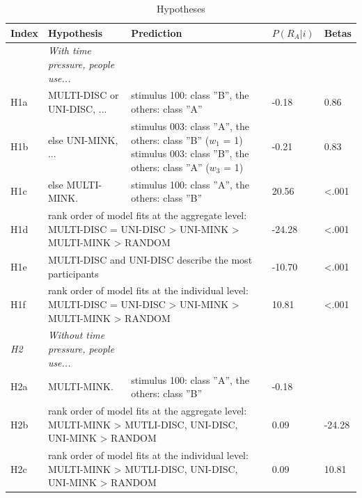 \documentclass[a4paper,man,natbib]{apa6}
\begin{document}
\begin{table}
\begin{center}
\begin{threeparttable}
\caption{Hypotheses}
\label{tab:estimates}
\begin{tabular*}{\textwidth}{lp{55mm}p{100mm}ll}
\toprule
\multicolumn{1}{l}{Index} & \multicolumn{1}{l}{Hypothesis} & \multicolumn{1}{l}{Prediction} & \multicolumn{1}{l}{$P(R_{A}|i)$} & \multicolumn{1}{l}{Betas}\\
\midrule
\addlinespace
\multicolumn{1}{l}{\emph{H1}} & \multicolumn{1}{l}{\emph{With time pressure, people use...}} \\
\addlinespace
H1a & MULTI-DISC or UNI-DISC, ... & stimulus 100: class ''B'', the others: class ''A'' & -0.18 & 0.86\\
\addlinespace
H1b & else UNI-MINK, ...  & stimulus 003: class ''A'', the others: class ''B'' ($w_1$ = 1) \newline stimulus 003: class ''B'', the others: class ''A'' ($w_3$ = 1) & -0.21 & 0.83\\
\addlinespace
H1c & else MULTI-MINK. & stimulus 100: class ''A'', the others: class ''B'' & 20.56 & <.001\\
\addlinespace
H1d & \multicolumn{2}{p{135mm}}{rank order of model fits at the aggregate level: \newline MULTI-DISC = UNI-DISC > UNI-MINK > MULTI-MINK > RANDOM} & -24.28 & <.001\\
\addlinespace
H1e & \multicolumn{2}{l}{MULTI-DISC and UNI-DISC describe the most participants} & -10.70 & <.001\\
\addlinespace
H1f & \multicolumn{2}{p{135mm}}{rank order of model fits at the individual level: \newline MULTI-DISC = UNI-DISC > UNI-MINK > MULTI-MINK > RANDOM} & 10.81 & <.001\\
\midrule
\multicolumn{1}{l}{\emph{H2}} & \multicolumn{1}{l}{\emph{Without time pressure, people use...}} \\
\addlinespace
H2a & MULTI-MINK. & stimulus 100: class ''A'', the others: class ''B'' & -0.18\\
\addlinespace
H2b & \multicolumn{2}{p{150mm}}{rank order of model fits at the aggregate level: \newline MULTI-MINK > {MUTLI-DISC, UNI-DISC, UNI-MINK} > RANDOM} & 0.09 & -24.28\\
\addlinespace
H2c & \multicolumn{2}{p{150mm}}{rank order of model fits at the individual level: \newline MULTI-MINK > {MUTLI-DISC, UNI-DISC, UNI-MINK} > RANDOM} & 0.09 & 10.81 \\

\end{tabular*}
\end{threeparttable}
\end{center}
\end{table}
\end{document}
